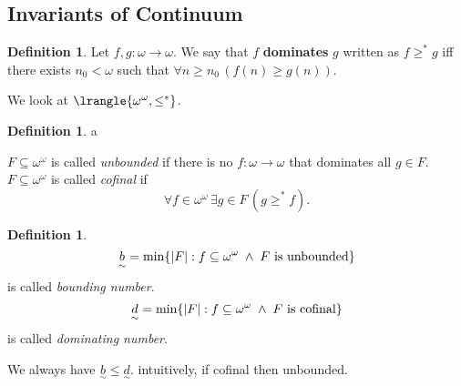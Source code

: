 \documentclass[11pt,pdftex,twoside,a4paper]{article}
\newcommand{\B}[1]{\textbf{#1}}
\theoremstyle{definition}
\newtheorem{ldef}[thm]{Definition}
\begin{document}
\subsection{Invariants of Continuum}

\begin{ldef}
Let \(f,g:\omega\to\omega\). We say that $f$ \B{dominates} $g$
written as \(f \geq^* g\) iff there exists \(n_0<\omega\)
such that \(\forall n\geq n_0\,(f(n)\geq g(n))\).
\end{ldef}
We look at \(\lrangle{\omega^\omega, \leq^*}\).
\begin{ldef}
{\nullfont a}
\begin{itemize}
 \(F\subseteq \omega^\omega\) is called \emph{unbounded}
if there is no \(f:\omega\to\omega\) that dominates all \(g\in F\).
 \(F\subseteq \omega^\omega\) is called \emph{cofinal} if
\begin{equation*}
 \forall f \in \omega^\omega\,\exists g\in F\,(g \geq^* f).
\end{equation*}
\end{itemize}
\end{ldef}

\begin{ldef}
\begin{equation*}
\underset{\sim}{b} 
  = \min\{|F|: f\subseteq \omega^\omega\;\land\; F\textnormal{ is unbounded}\}
\end{equation*}
is called \emph{bounding number}.
\begin{equation*}
\underset{\sim}{d}
  = \min\{|F|: f\subseteq \omega^\omega\;\land\; F\textnormal{ is cofinal}\}
\end{equation*}
is called \emph{dominating number}.
\end{ldef}
We always have \(\underset{\sim}{b} \leq \underset{\sim}{d}\).
intuitively, if cofinal then unbounded.
\end{document}
